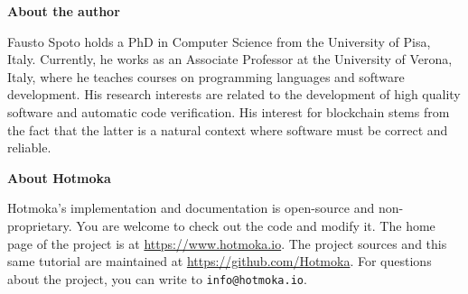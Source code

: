 \newpage

\pagestyle{empty}

\nbvspace[1]
\normalsize

\textbf{About the author}

Fausto Spoto holds a PhD in Computer Science from the University of Pisa, Italy.
Currently, he works as an Associate Professor at the University of Verona, Italy, where
he teaches courses on programming languages and software development.
His research interests are related to the development of high quality software
and automatic code verification. His interest for blockchain stems
from the fact that the latter is a natural context where
software must be correct and reliable.

\nbvspace[1]

\textbf{About Hotmoka}

Hotmoka's implementation and documentation is open-source and
non-proprietary. You are welcome to check out the code and modify it.
The home page of the project is at \url{https://www.hotmoka.io}.
The project sources and this same tutorial
are maintained at \url{https://github.com/Hotmoka}.
For questions about the project, you can write to \texttt{info@hotmoka.io}.
